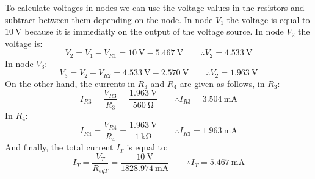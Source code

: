 \documentclass[letterpaper]{article}
\begin{document}
To calculate voltages in nodes we can use the voltage values in the resistors and subtract between
them depending on the node. In node $V_1$ the voltage is equal to $\SI{10}{\volt}$ because it is
immediatly on the output of the voltage source. In node $V_2$ the voltage is:
\[V_2 = V_1 - V_{R1} = \SI{10}{\volt}-\SI{5.467}{\volt}\qquad\therefore V_2 = \SI{4.533}{\volt}\]
In node $V_3$:
\[V_3 = V_2 - V_{R2} = \SI{4.533}{\volt}-\SI{2.570}{\volt}\qquad\therefore V_2 = \SI{1.963}{\volt}\]
On the other hand, the currents in $R_3$ and $R_4$ are given as follows, in $R_3$:
\[I_{R3} = \frac{V_{R3}}{R_3} = \frac{\SI{1.963}{\volt}}{\SI{560}{\ohm}}\qquad\therefore I_{R3} =
\SI{3.504}{\milli\ampere}\]
In $R_4$:
\[I_{R4} = \frac{V_{R4}}{R_4} = \frac{\SI{1.963}{\volt}}{\SI{1}{\kilo\ohm}}\qquad\therefore I_{R3} =
\SI{1.963}{\milli\ampere}\]
And finally, the total current $I_T$ is equal to:
\[I_T = \frac{V_T}{R_{eqT}} = \frac{\SI{10}{\volt}}{\SI{1828.974}{\milli\ampere}}\qquad\therefore I_T =
\SI{5.467}{\milli\ampere}\]
\end{document}
